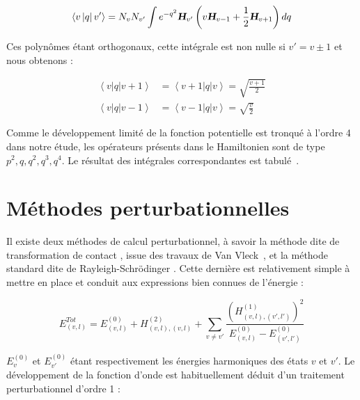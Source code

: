 \begin{equation}
\left\langle v \left|q \right|v' \right\rangle = N_v N_{v'} \int e^{-q^2} \textsl{\textbf{H}}_{v'}\left(v\textsl{\textbf{H}}_{v-1} + \frac{1}{2} \textsl{\textbf{H}}_{v+1}\right) dq
\end{equation}

Ces polynômes étant orthogonaux, cette intégrale est non nulle si $v' = v\pm 1$ et nous obtenons :

\begin{align}
\left\langle v \left|q \right| v+1\right\rangle &= \left\langle v+1 \left|q \right| v\right\rangle = \sqrt{\frac{v+1}{2}} \\
\left\langle v \left|q \right| v-1\right\rangle &= \left\langle v-1 \left|q \right| v\right\rangle = \sqrt{\frac{v}{2}}
\end{align}

Comme le développement limité de la fonction potentielle est tronqué à l'ordre 4 dans notre étude, les opérateurs présents dans le Hamiltonien sont de type $p^2,q,q^2,q^3,q^4$. Le résultat des intégrales correspondantes est tabulé~\cite{carbonniere2002calcul}.



\section{Méthodes perturbationnelles}

Il existe deux méthodes de calcul perturbationnel, à savoir la méthode dite de \og transformation de contact \fg, issue des travaux de Van Vleck~\cite{papousek1982molecular,van1929sigma}, et la méthode standard dite de Rayleigh-Schrödinger \cite{oka1967vibration}.
Cette dernière est relativement simple à mettre en place et conduit aux expressions bien connues de l'énergie :

\begin{equation}
E^{Tot}_{(v,l)} = E^{(0)}_{(v,l)} + H^{(2)}_{(v,l),(v,l)} + \sum_{v\neq v'} \frac{(H^{(1)}_{(v,l),(v',l')})^2}{E^{(0)}_{(v,l)} - E^{(0)}_{(v',l')}}
\end{equation}

$E^{(0)}_v$ et $E^{(0)}_{v'}$ étant respectivement les énergies harmoniques des états $v$ et $v'$.
Le développement de la fonction d'onde est habituellement déduit d'un traitement perturbationnel d'ordre 1 :

